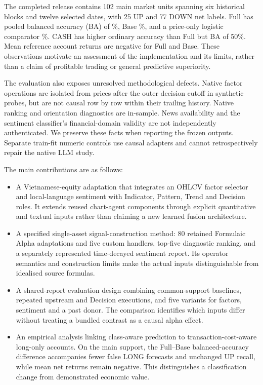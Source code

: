 The completed release contains 102 main market units spanning six historical blocks and twelve selected dates, with 25 UP and 77 DOWN net labels. Full has pooled balanced accuracy (BA) of \FullBA\%, Base \BaseBA\%, and a price-only logistic comparator \LogisticPriceBA\%. CASH has higher ordinary accuracy than Full but BA of 50\%. Mean reference account returns are negative for Full and Base. These observations motivate an assessment of the implementation and its limits, rather than a claim of profitable trading or general predictive superiority.

The evaluation also exposes unresolved methodological defects. Native factor operations are isolated from prices after the outer decision cutoff in synthetic probes, but are not causal row by row within their trailing history. Native ranking and orientation diagnostics are in-sample. News availability and the sentiment classifier's financial-domain validity are not independently authenticated. We preserve these facts when reporting the frozen outputs. Separate train-fit numeric controls use causal adapters and cannot retrospectively repair the native LLM study.

The main contributions are as follows:
\begin{itemize}
\item A Vietnamese-equity adaptation that integrates an OHLCV factor selector and local-language sentiment with Indicator, Pattern, Trend and Decision roles. It extends reused chart-agent components through explicit quantitative and textual inputs rather than claiming a new learned fusion architecture.
\item A specified single-asset signal-construction method: 80 retained Formulaic Alpha adaptations and five custom handlers, top-five diagnostic ranking, and a separately represented time-decayed sentiment report. Its operator semantics and construction limits make the actual inputs distinguishable from idealised source formulas.
\item A shared-report evaluation design combining common-support baselines, repeated upstream and Decision executions, and five variants for factors, sentiment and a past donor. The comparison identifies which inputs differ without treating a bundled contrast as a causal alpha effect.
\item An empirical analysis linking class-aware prediction to transaction-cost-aware long-only accounts. On the main support, the Full--Base balanced-accuracy difference accompanies fewer false LONG forecasts and unchanged UP recall, while mean net returns remain negative. This distinguishes a classification change from demonstrated economic value.
\end{itemize}

